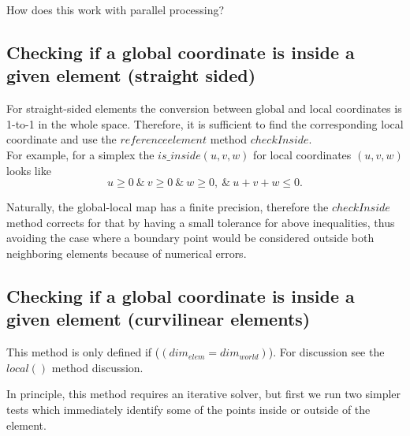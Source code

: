 \noindent
How does this work with parallel processing?

\subsection{Checking if a global coordinate is inside a given element (straight sided)}
\label{subsection-isinside-linear}

\noindent
For straight-sided elements the conversion between global and local coordinates is 1-to-1 in the whole space.
Therefore, it is sufficient to find the corresponding local coordinate and use the $referenceelement$ method $checkInside$. \\

\noindent
For example, for a simplex the $is\_inside(u,v,w)$ for local coordinates $(u,v,w)$ looks like 
\[u \geq 0\ \&\ v \geq 0\ \&\ w \geq 0,\ \&\ u+v+w \leq 0. \]

\noindent
Naturally, the global-local map has a finite precision, therefore the $checkInside$ method corrects for that by having a small tolerance for above inequalities, thus avoiding the case where a boundary point would be considered outside both neighboring elements because of numerical errors.


\subsection{Checking if a global coordinate is inside a given element (curvilinear elements)}
\label{subsection-isinside-nonlinear}

\noindent
This method is only defined if ($(dim_{elem} = dim_{world})$). For discussion see the $local()$ method discussion.

\noindent
In principle, this method requires an iterative solver, but first we run two simpler tests which immediately identify some of the points inside or outside of the element. \\

